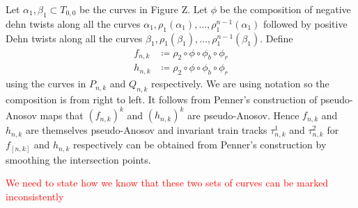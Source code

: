Let $\alpha_1,\beta_1 \subset T_{0,0}$ be the curves in Figure Z. Let $\phi$ be the composition of negative dehn twists along all the curves $\alpha_1, \rho_1(\alpha_1), \dots, \rho_1^{n-1}(\alpha_1)$ followed by positive Dehn twists along all the curves $\beta_1,\rho_1(\beta_1),\dots,\rho_1^{n-1}(\beta_1)$. Define
\begin{align*}
    f_{n,k} &\coloneqq \rho_2 \circ \phi \circ \phi_b \circ \phi_r \\
    h_{n,k} & \coloneqq \rho_2 \circ \phi \circ \phi_b \circ \phi_r
\end{align*}
using the curves in $P_{n,k}$ and $Q_{n,k}$ respectively. We are using notation so the composition is from right to left. It follows from Penner's construction of pseudo-Anosov maps that $(f_{n,k})^k$ and $(h_{n,k})^k$ are pseudo-Anosov. Hence $f_{n,k}$ and $h_{n,k}$ are themselves pseudo-Anosov and invariant train tracks $\tau^1_{n,k}$ and $\tau^2_{n,k}$ for $f_[n,k]$ and $h_{n,k}$ respectively can be obtained from Penner's construction by smoothing the intersection points.

\textcolor{red}{We need to state how we know that these two sets of curves can be marked inconsistently}
